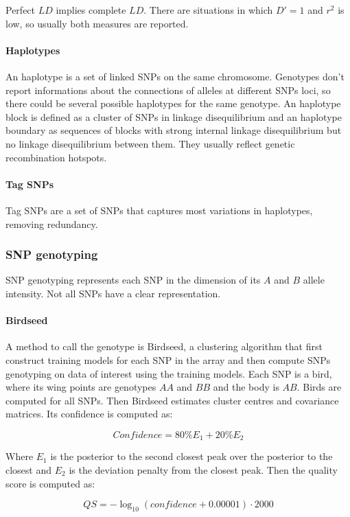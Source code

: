 				Perfect $LD$ implies complete $LD$.
				There are situations in which $D'=1$ and $r^2$ is low, so usually both measures are reported.

			\paragraph{Haplotypes}
			An haplotype is a set of linked SNPs on the same chromosome.
			Genotypes don't report informations about the connections of alleles at different SNPs loci, so there could be several possible haplotypes for the same genotype.
			An haplotype block is defined as a cluster of SNPs in linkage disequilibrium and an haplotype boundary as sequences of blocks with strong internal linkage disequilibrium but no linkage disequilibrium between them.
			They usually reflect genetic recombination hotspots.

			\paragraph{Tag SNPs}
			Tag SNPs are a set of SNPs that captures most variations in haplotypes, removing redundancy.

		\subsubsection{SNP genotyping}
		SNP genotyping represents each SNP in the dimension of its $A$ and $B$ allele intensity.
		Not all SNPs have a clear representation.

			\paragraph{Birdseed}
			A method to call the genotype is Birdseed, a clustering algorithm that first construct training models for each SNP in the array and then compute SNPs genotyping on data of interest using the training models.
			Each SNP is a bird, where its wing points are genotypes $AA$ and $BB$ and the body is $AB$.
			Birds are computed for all SNPs.
			Then Birdseed estimates cluster centres and covariance matrices.
			Its confidence is computed as:

			$$Confidence = 80\% E_1 + 20\% E_2$$

			Where $E_1$ is the posterior to the second closest peak over the posterior to the closest and $E_2$ is the deviation penalty from the closest peak.
			Then the quality score is computed as:

			$$QS = -\log_{10}(confidence + 0.00001)\cdot 2000$$

